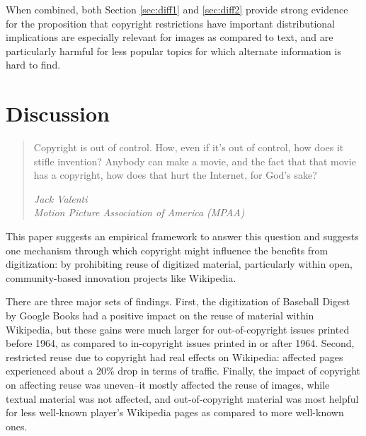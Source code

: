 \documentclass[11pt]{article}
\begin{document}

When combined, both Section \ref{sec:diff1} and \ref{sec:diff2} provide strong evidence for the proposition that copyright restrictions have important distributional implications are especially relevant for images as compared to text, and are particularly harmful for less popular topics for which alternate information is hard to find. 

\section{Discussion}
\label{sec:discussion}

\begin{quote}
Copyright is out of control. How, even if it's out of control, how does it stifle invention? Anybody can make a movie, and the fact that that movie has a copyright, how does that hurt the Internet, for God's sake?
\begin{flushright} \emph{Jack Valenti}\\
\emph{Motion Picture Association of America (MPAA)}
\end{flushright}
\end{quote}

This paper suggests an empirical framework to answer this question and suggests one mechanism through which copyright might influence the benefits from digitization: by prohibiting reuse of digitized material, particularly within open, community-based innovation projects like Wikipedia. 

There are three major sets of findings. First, the digitization of Baseball Digest by Google Books had a positive impact on the reuse of material within Wikipedia, but these gains were much larger for out-of-copyright issues printed before 1964, as compared to in-copyright issues printed in or after 1964. Second, restricted reuse due to copyright had real effects on Wikipedia: affected pages experienced about a 20\% drop in terms of traffic. Finally, the impact of copyright on affecting reuse was uneven--it mostly affected the reuse of images, while textual material was not affected, and out-of-copyright material was most helpful for less well-known player's Wikipedia pages as compared to more well-known ones. 
\end{document}
